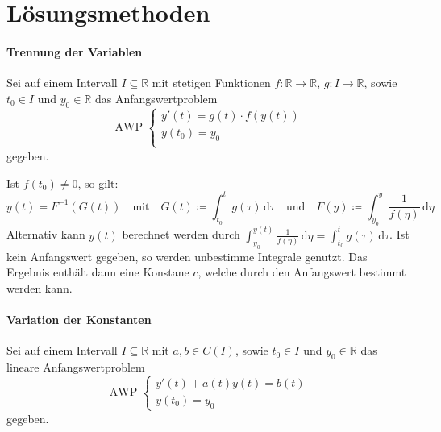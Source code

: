 \documentclass[a4paper, 11pt, accentcolor = tud3b]{tudreport}
\begin{document}
        \section{Lösungsmethoden}
            \paragraph{Trennung der Variablen}
                Sei auf einem Intervall $ I \subseteq \mathbb{R} $ mit stetigen Funktionen $ f : \mathbb{R} \rightarrow \mathbb{R} $, $ g : I \rightarrow \mathbb{R} $, sowie $ t _ 0 \in I $ und $ y _ 0 \in \mathbb{R} $ das Anfangswertproblem
                \begin{equation*}
                    \text{AWP }
                    \begin{cases}
                        y'(t) = g(t) \cdot f(y(t)) \\
                        y(t _ 0) = y _ 0 \\
                    \end{cases}
                \end{equation*}
                gegeben.

                Ist $ f(t _ 0) \neq 0 $, so gilt:
                \begin{equation*}
                    y(t) = F ^ { -1 } (G(t)) \quad\text{mit}\quad G(t) \coloneqq \int _ { t _ 0 } ^ t \! g(\tau) \, \mathrm{d}\tau \quad\text{und}\quad F(y) \coloneqq \int _ { y _ 0 } ^ y \! \frac{1}{f(\eta)} \, \mathrm{d}\eta
                \end{equation*}
                Alternativ kann $ y(t) $ berechnet werden durch $ \int _ { y _ 0 } ^ { y(t) } \! \frac{1}{f(\eta)} \, \mathrm{d}\eta = \int _ { t _ 0 } ^ { t } \! g(\tau) \, \mathrm{d}\tau $. Ist kein Anfangswert gegeben, so werden unbestimme Integrale genutzt. Das Ergebnis enthält dann eine Konstane $ c $, welche durch den Anfangswert bestimmt werden kann.

            \paragraph{Variation der Konstanten}
                Sei auf einem Intervall $ I \subseteq \mathbb{R} $ mit $ a, b \in C(I) $, sowie $ t _ 0 \in I $ und $ y _ 0 \in \mathbb{R} $ das lineare Anfangswertproblem
                \begin{equation*}
                    \text{AWP }
                    \begin{cases}
                        y'(t) + a(t)y(t) = b(t) \\
                        y(t _ 0) = y _ 0
                    \end{cases}
                \end{equation*}
                gegeben.
\end{document}

